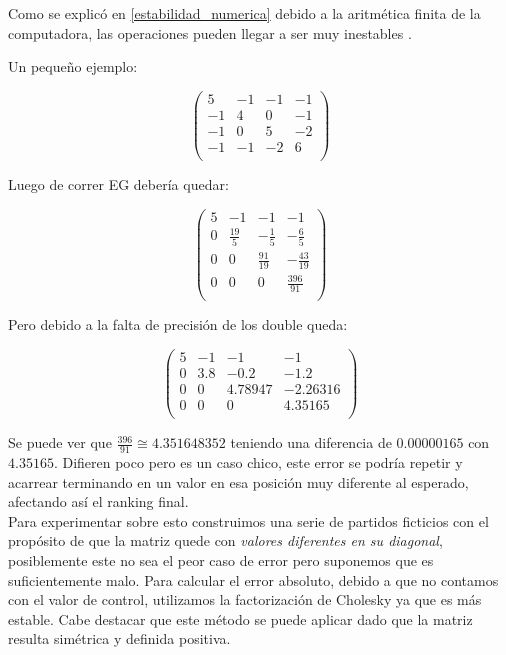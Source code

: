 Como se explicó en \ref{estabilidad_numerica} debido a la aritmética finita de la computadora,
las operaciones pueden llegar a ser muy inestables \cite{arithmetic}.

Un pequeño ejemplo:

$$\begin{pmatrix}
    5 & -1 & -1 & -1 \\
    -1 & 4 & 0 & -1 \\
    -1 & 0 & 5 & -2 \\
    -1 & -1 & -2 & 6 \\
\end{pmatrix}$$

Luego de correr EG debería quedar:

$$\begin{pmatrix}
    5 & -1 & -1 & -1 \\
    0 & \frac{19}{5} & -\frac{1}{5} & -\frac{6}{5} \\
    0 & 0 & \frac{91}{19} & -\frac{43}{19} \\
    0 & 0 & 0 & \frac{396}{91} \\
\end{pmatrix}$$

Pero debido a la falta de precisión de los double queda:

$$\begin{pmatrix}
    5 & -1 & -1 & -1 \\
    0 & 3.8 & -0.2 & -1.2 \\
    0 & 0 & 4.78947 & -2.26316 \\
    0 & 0 & 0 & 4.35165 \\
\end{pmatrix}$$

Se puede ver que $\frac{396}{91} \cong 4.351648352$ teniendo una diferencia de $0.00000165$ con $4.35165$.
Difieren poco pero es un caso chico, este error se podría repetir y acarrear terminando en un valor en esa posición muy diferente al esperado, afectando así el ranking final.\\

Para experimentar sobre esto construimos una serie de partidos ficticios con el propósito de que la matriz quede con \textit{valores diferentes en su diagonal}, posiblemente este no sea el peor caso de error pero suponemos que es suficientemente malo. Para calcular el error absoluto, debido a que no contamos con el valor de control, utilizamos la factorización de Cholesky ya que es más estable. Cabe destacar que este método se puede aplicar dado que la matriz resulta simétrica y definida positiva\cite{CMMpaper}.\\

